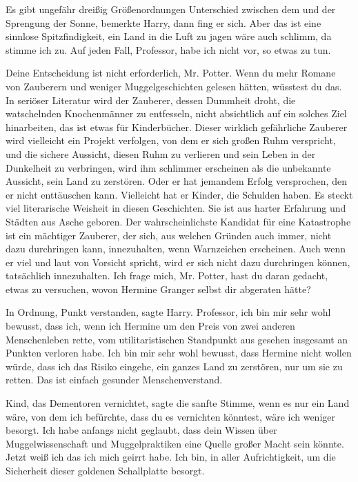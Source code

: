\glqq{}Es gibt ungefähr dreißig Größenordnungen Unterschied zwischen dem und der
Sprengung der Sonne\grqq{}, bemerkte Harry, dann fing er sich. \glqq{}Aber das
ist eine sinnlose Spitzfindigkeit, ein Land in die Luft zu jagen wäre auch
schlimm, da stimme ich zu. Auf jeden Fall, Professor, habe ich nicht vor, so
etwas zu tun.\grqq{}

\glqq{}Deine Entscheidung ist nicht erforderlich, Mr. Potter. Wenn du mehr Romane
von Zauberern und weniger Muggelgeschichten gelesen hätten, wüsstest du das. In
seriöser Literatur wird der Zauberer, dessen Dummheit droht, die watschelnden
Knochenmänner zu entfesseln, nicht absichtlich auf ein solches Ziel hinarbeiten,
das ist etwas für Kinderbücher. Dieser wirklich gefährliche Zauberer wird
vielleicht ein Projekt verfolgen, von dem er sich großen Ruhm verspricht, und
die sichere Aussicht, diesen Ruhm zu verlieren und sein Leben in der Dunkelheit
zu verbringen, wird ihm schlimmer erscheinen als die unbekannte Aussicht, sein
Land zu zerstören. Oder er hat jemandem Erfolg versprochen, den er nicht
enttäuschen kann. Vielleicht hat er Kinder, die Schulden haben. Es steckt viel
literarische Weisheit in diesen Geschichten. Sie ist aus harter Erfahrung und
Städten aus Asche geboren. Der wahrscheinlichste Kandidat für eine Katastrophe
ist ein mächtiger Zauberer, der sich, aus welchen Gründen auch immer, nicht dazu
durchringen kann, innezuhalten, wenn Warnzeichen erscheinen. Auch wenn er viel
und laut von Vorsicht spricht, wird er sich nicht dazu durchringen können,
tatsächlich innezuhalten. Ich frage mich, Mr. Potter, hast du daran gedacht,
etwas zu versuchen, wovon Hermine Granger selbst dir abgeraten hätte?\grqq{}

\glqq{}In Ordnung, Punkt verstanden\grqq{}, sagte Harry. \glqq{}Professor, ich bin
mir sehr wohl bewusst, dass ich, wenn ich Hermine um den Preis von zwei anderen
Menschenleben rette, vom utilitaristischen Standpunkt aus gesehen insgesamt an
Punkten verloren habe. Ich bin mir sehr wohl bewusst, dass Hermine nicht wollen
würde, dass ich das Risiko eingehe, ein ganzes Land zu zerstören, nur um sie zu
retten. Das ist einfach gesunder Menschenverstand.\grqq{}

\glqq{}Kind, das Dementoren vernichtet\grqq{}, sagte die sanfte Stimme, \glqq{}
wenn es nur ein Land wäre, von dem ich befürchte, dass du es vernichten
könntest, wäre ich weniger besorgt. Ich habe anfangs nicht geglaubt, dass dein
Wissen über Muggelwissenschaft und Muggelpraktiken eine Quelle großer Macht sein
könnte. Jetzt weiß ich das ich mich geirrt habe. Ich bin, in aller
Aufrichtigkeit, um die Sicherheit dieser goldenen Schallplatte besorgt.\grqq{}

